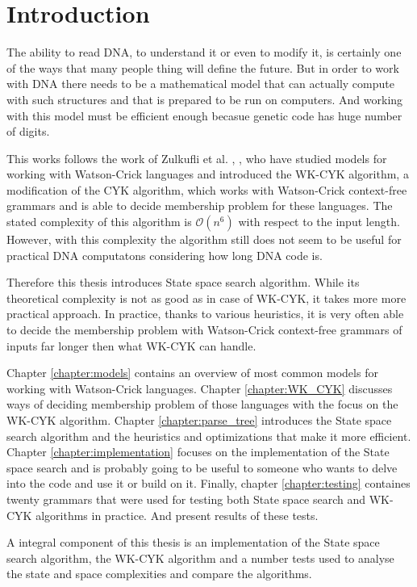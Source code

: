 \chapter{Introduction}

The ability to read DNA, to understand it or even to modify it, is certainly one of the ways that many people thing will define the future. But in order to work with DNA there needs to be a mathematical model that can actually compute with such structures and that is prepared to be run on computers. And working with this model must be efficient enough becasue genetic code has huge number of digits.

This works follows the work of Zulkufli et al. \cite{WK_GRAMMARS_1}, \cite{WK_GRAMMARS_2}, \cite{WK_CYK} who have studied models for working with Watson-Crick languages and introduced the WK-CYK algorithm, a modification of the CYK algorithm, which works with Watson-Crick context-free grammars and is able to decide membership problem for these languages. The stated complexity of this algorithm is $\mathcal{O}(n^6)$ with respect to the input length. However, with this complexity the algorithm still does not seem to be useful for practical DNA computatons considering how long DNA code is.

Therefore this thesis introduces State space search algorithm. While its theoretical complexity is not as good as in case of WK-CYK, it takes more more practical approach. In practice, thanks to various heuristics, it is very often able to decide the membership problem with Watson-Crick context-free grammars of inputs far longer then what WK-CYK can handle.

Chapter \ref{chapter:models} contains an overview of most common models for working with Watson-Crick languages. Chapter \ref{chapter:WK_CYK} discusses ways of deciding membership problem of those languages with the focus on the WK-CYK algorithm. Chapter \ref{chapter:parse_tree} introduces the State space search algorithm and the heuristics and optimizations that make it more efficient. Chapter \ref{chapter:implementation} focuses on the implementation of the State space search and is probably going to be useful to someone who wants to delve into the code and use it or build on it. Finally, chapter \ref{chapter:testing} containes twenty grammars that were used for testing both State space search and WK-CYK algorithms in practice. And present results of these tests.

A integral component of this thesis is an implementation of the State space search algorithm, the WK-CYK algorithm and a number tests used to analyse the state and space complexities and compare the algorithms.

